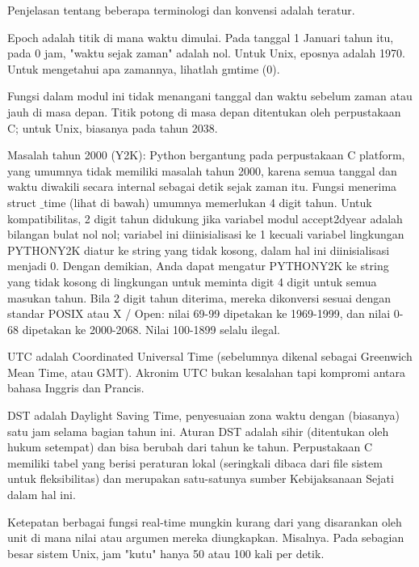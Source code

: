 \noindent 
Penjelasan tentang beberapa terminologi dan konvensi adalah teratur. \par
\vspace{12pt}
\noindent 
Epoch adalah titik di mana waktu dimulai. Pada tanggal 1 Januari tahun itu, pada 0 jam, "waktu sejak zaman" adalah nol. Untuk Unix, eposnya adalah 1970. Untuk mengetahui apa zamannya, lihatlah gmtime (0). \par
\vspace{12pt}
\noindent 
Fungsi dalam modul ini tidak menangani tanggal dan waktu sebelum zaman atau jauh di masa depan. Titik potong di masa depan ditentukan oleh perpustakaan C; untuk Unix, biasanya pada tahun 2038. \par
\vspace{12pt}
\noindent 
Masalah tahun 2000 (Y2K): Python bergantung pada perpustakaan C platform, yang umumnya tidak memiliki masalah tahun 2000, karena semua tanggal dan waktu diwakili secara internal sebagai detik sejak zaman itu. Fungsi menerima struct $  \_  $time (lihat di bawah) umumnya memerlukan 4 digit tahun. Untuk kompatibilitas, 2 digit tahun didukung jika variabel modul accept2dyear adalah bilangan bulat nol nol; variabel ini diinisialisasi ke 1 kecuali variabel lingkungan PYTHONY2K diatur ke string yang tidak kosong, dalam hal ini diinisialisasi menjadi 0. Dengan demikian, Anda dapat mengatur PYTHONY2K ke string yang tidak kosong di lingkungan untuk meminta digit 4 digit untuk semua masukan tahun. Bila 2 digit tahun diterima, mereka dikonversi sesuai dengan standar POSIX atau X / Open: nilai 69-99 dipetakan ke 1969-1999, dan nilai 0-68 dipetakan ke 2000-2068. Nilai 100-1899 selalu ilegal. \par
\vspace{12pt}
\noindent 
UTC adalah Coordinated Universal Time (sebelumnya dikenal sebagai Greenwich Mean Time, atau GMT). Akronim UTC bukan kesalahan tapi kompromi antara bahasa Inggris dan Prancis. \par
\vspace{12pt}
\noindent 
DST adalah Daylight Saving Time, penyesuaian zona waktu dengan (biasanya) satu jam selama bagian tahun ini. Aturan DST adalah sihir (ditentukan oleh hukum setempat) dan bisa berubah dari tahun ke tahun. Perpustakaan C memiliki tabel yang berisi peraturan lokal (seringkali dibaca dari file sistem untuk fleksibilitas) dan merupakan satu-satunya sumber Kebijaksanaan Sejati dalam hal ini. \par
\vspace{12pt}
\noindent 
Ketepatan berbagai fungsi real-time mungkin kurang dari yang disarankan oleh unit di mana nilai atau argumen mereka diungkapkan. Misalnya. Pada sebagian besar sistem Unix, jam "kutu" hanya 50 atau 100 kali per detik. \par
